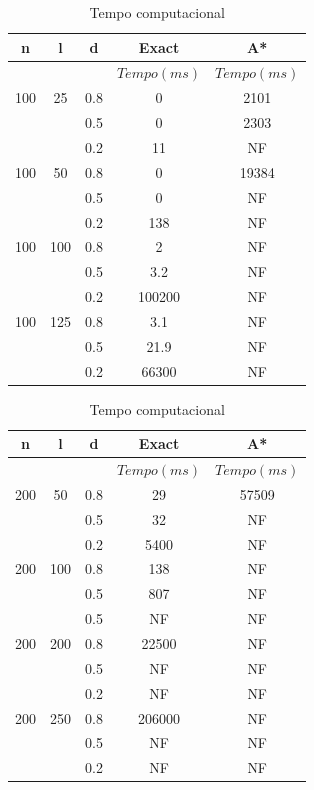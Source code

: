 \documentclass[12pt]{article}
\begin{document}
\begin{multicols}{2}
			\begin {table}[H]
				\begin{tabular}{c|c|c|c|c} \hline
					n & l & d & Exact & A* \\ \hline
					& & & $Tempo(ms)$ & $Tempo(ms)$\\ \hline
					100 & 25  & 0.8 &  0 & 2101\\
					   &      & 0.5 &  0 & 2303\\
					   &      & 0.2 & 11 & NF\\ \hline
					100 & 50  & 0.8 &  0 & 19384 \\
					   &      & 0.5 &  0 & NF\\
					   &      & 0.2 & 138 & NF\\ \hline
					100 & 100 & 0.8 &  2 & NF\\
					   &      & 0.5 & 3.2 & NF\\
					   &      & 0.2 & 100200 & NF\\ \hline
					100 & 125 & 0.8 & 3.1 & NF\\
					   &      & 0.5 & 21.9 & NF\\
					   &      & 0.2 & 66300 & NF\\ \hline
				\end{tabular}
				\caption {Tempo computacional}
			\end {table}

			\begin {table}[H]
				\begin{tabular}{c|c|c|c|c} \hline
					n & l & d & Exact & A* \\ \hline
					& & & $Tempo(ms)$ & $Tempo(ms)$\\ \hline
					200 & 50  & 0.8 & 29 & 57509\\
					   &      & 0.5 & 32 & NF\\
					   &      & 0.2 & 5400 & NF\\ \hline
					200 & 100  & 0.8 & 138 & NF \\
					   &      & 0.5 & 807 & NF\\
					   &      & 0.5 & NF & NF\\ \hline
					200 & 200 & 0.8 &  22500 & NF\\
					   &      & 0.5 & NF & NF\\
					   &      & 0.2 & NF & NF\\ \hline
					200 & 250 & 0.8 & 206000 & NF\\
					   &      & 0.5 & NF & NF\\
					   &      & 0.2 & NF & NF\\ \hline
				\end{tabular}
				\caption {Tempo computacional}
			\end {table}
		\end{multicols}
\end{document}

